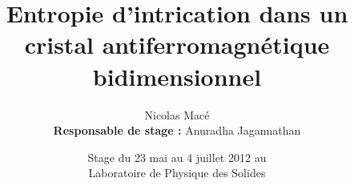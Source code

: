 \documentclass[xcolor=dvipsnames]{beamer}
\title[Entropie d'intrication dans un antiferromagnétique]{Entropie d'intrication dans un cristal antiferromagnétique bidimensionnel}
\date{Stage du 23 mai au 4 juillet 2012 au \\ \Huge{Laboratoire de Physique des Solides}}
\author{Nicolas Macé\\ \textbf{Responsable de stage :} Anuradha Jagannathan}
\newcommand{\1}{\ensuremath{\ket{\om_1\bom_1}}\xspace}
\newcommand{\2}{\ensuremath{\ket{\om_2\bom_2}}\xspace}
\begin{document}
\begin{frame}
\begin{titlepage}
\end{titlepage}
\end{frame}

%
%  
%
\end{document}
